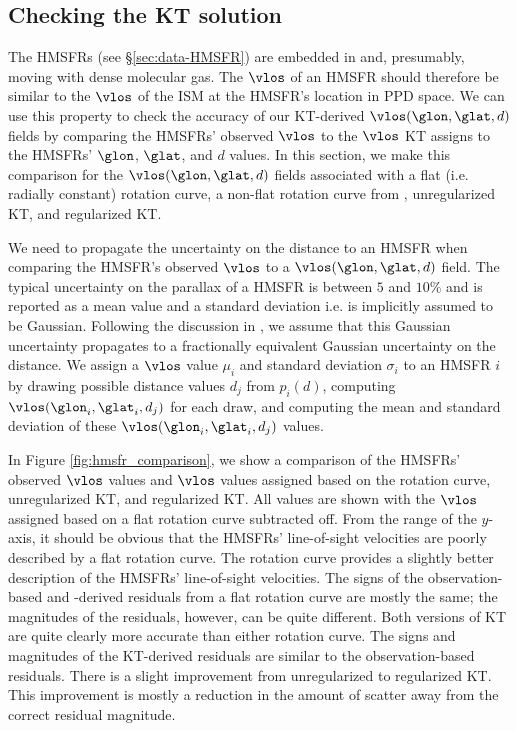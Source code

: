 \subsection{Checking the KT solution}
\label{sec:KT-validation}
The \Reid{} HMSFRs (see \S \ref{sec:data-HMSFR}) are embedded in and, presumably, moving with dense molecular gas.
The $\vlos$ of an HMSFR should therefore be similar to the $\vlos$ of the ISM at the HMSFR's location in PPD space.
We can use this property to check the accuracy of our KT-derived $\vlos(\glon, \glat, d)$ fields by comparing the HMSFRs' observed $\vlos$ to the $\vlos$ KT assigns to the HMSFRs' $\glon$, $\glat$, and $d$ values. 
In this section, we make this comparison for the $\vlos(\glon, \glat, d)$ fields associated with a flat (i.e. radially constant) rotation curve, a non-flat rotation curve from \citet{Clemens:1985dp}, unregularized KT, and regularized KT. 

We need to propagate the uncertainty on the distance to an HMSFR when comparing the HMSFR's observed $\vlos$ to a $\vlos(\glon, \glat, d)$ field.
The typical uncertainty on the parallax of a \Reid{} HMSFR is between $5$ and $10\%$ and is reported as a mean value and a standard deviation i.e. is implicitly assumed to be Gaussian. 
Following the discussion in \citet{2009ApJ...704.1704B}, we assume that this Gaussian uncertainty propagates to a fractionally equivalent Gaussian uncertainty on the distance.
We assign a $\vlos$ value $\mu_{i}$ and standard deviation $\sigma_{i}$ to an HMSFR $i$ by drawing possible distance values $d_j$ from $p_i(d)$, computing $\vlos(\glon_{i}, \glat_{i}, d_j)$ for each draw, and computing the mean and standard deviation of these $\vlos(\glon_{i}, \glat_{i}, d_j)$ values. 

In Figure \ref{fig:hmsfr_comparison}, we show a comparison of the HMSFRs' observed $\vlos$ values and $\vlos$ values assigned based on the \citet{Clemens:1985dp} rotation curve, unregularized KT, and regularized KT.
All values are shown with the $\vlos$ assigned based on a flat rotation curve subtracted off. 
From the range of the $y$-axis, it should be obvious that the HMSFRs' line-of-sight velocities are  poorly described by a flat rotation curve.
The \citet{Clemens:1985dp} rotation curve provides a slightly better description of the HMSFRs' line-of-sight velocities.
The signs of the observation-based and \citet{Clemens:1985dp}-derived residuals from a flat rotation curve are mostly the same; the magnitudes of the residuals, however, can be quite different.
Both versions of KT are quite clearly more accurate than either rotation curve.
The signs and magnitudes of the KT-derived residuals are similar to the observation-based residuals.
There is a slight improvement from unregularized to regularized KT.
This improvement is mostly a reduction in the amount of scatter away from the correct residual magnitude. 

